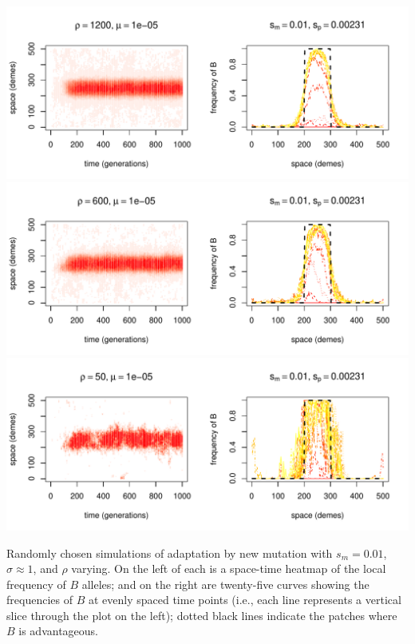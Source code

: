 \documentclass{article}
\begin{document}
\begin{sfigure}
  \begin{center}
    \includegraphics{example-mutation-sims/43099-r1-501-sb0_01-sm-0_01-N1200-pophistory-run}
    \includegraphics{example-mutation-sims/69787-r1-501-sb0_01-sm-0_01-N600-pophistory-run}
    \includegraphics{example-mutation-sims/11821-r1-501-sb0_01-sm-0_01-N50-pophistory-run}
  \end{center}
  \caption{
    Randomly chosen simulations of adaptation by new mutation
    with $s_m=0.01$, $\sigma\approx 1$, and $\rho$ varying.
    On the left of each is a space-time heatmap of the local frequency of $B$ alleles;
    and on the right are twenty-five curves showing the frequencies of $B$ at evenly spaced time points
    (i.e., each line represents a vertical slice through the plot on the left);
    dotted black lines indicate the patches where $B$ is advantageous.
  } \label{sfig:sims_2}
\end{sfigure}
\end{document}
